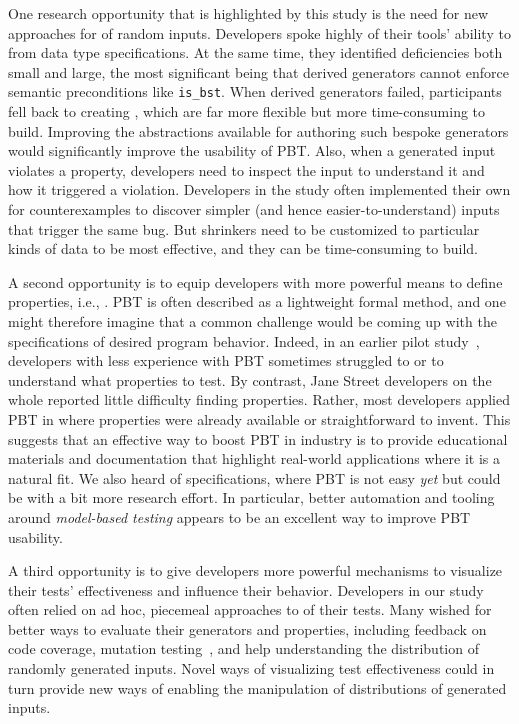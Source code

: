 One research opportunity that is highlighted by this
study is the need for new approaches for
 of random inputs. Developers spoke highly
of their tools' ability to  from data type specifications. At the same time,
they identified deficiencies both
small and large, the most significant being that derived generators
cannot enforce semantic preconditions like \lstinline{is_bst}.
%
When derived generators failed, participants fell back to creating
, which are far more flexible but
more time-consuming to build.  Improving the
abstractions available for authoring such bespoke generators would
significantly improve the usability of PBT.
%
Also, when a generated input violates a property, developers need to
inspect the input to understand it and how it triggered a violation.
Developers in the study often
implemented their own  for counterexamples to discover
simpler (and hence easier-to-understand) inputs that trigger the same bug.
%
But shrinkers need to be customized to particular kinds of data to be
most effective, and they can be time-consuming to build.

%
A second opportunity is to equip developers
with more powerful means to define properties, i.e., .  PBT is often described as
a lightweight formal method, and one might therefore imagine that a
common challenge would be coming up with the specifications of desired
program behavior. Indeed, in an earlier pilot
study~\cite{goldstein_problems_2022}, developers with less experience
with PBT sometimes struggled to  or to
understand what properties to test.  By contrast, Jane Street
developers on the whole reported little difficulty finding
properties. Rather, most developers applied PBT in
 where properties were already
available or straightforward to invent.  This suggests that an
effective way to boost PBT in industry is to provide educational
materials and documentation that highlight real-world applications
where it is a natural fit.
%
We also heard  of
specifications, where PBT is not easy {\em yet} but could be with a
bit more research effort.  In particular, better automation and
tooling around {\em model-based testing} appears to be an excellent
way to improve PBT usability.

A third opportunity is to give developers more powerful
 mechanisms to visualize their tests'
effectiveness
and influence their behavior. Developers in our study often relied on ad hoc,
piecemeal approaches to  of their
tests. Many wished for better ways to evaluate their generators and
properties, including feedback on code coverage, mutation
testing~\cite{papadakis_mutation_2018}, and help understanding the
distribution of randomly generated inputs. Novel ways of visualizing
test effectiveness could in turn provide new ways of enabling the
manipulation of distributions of generated inputs.

